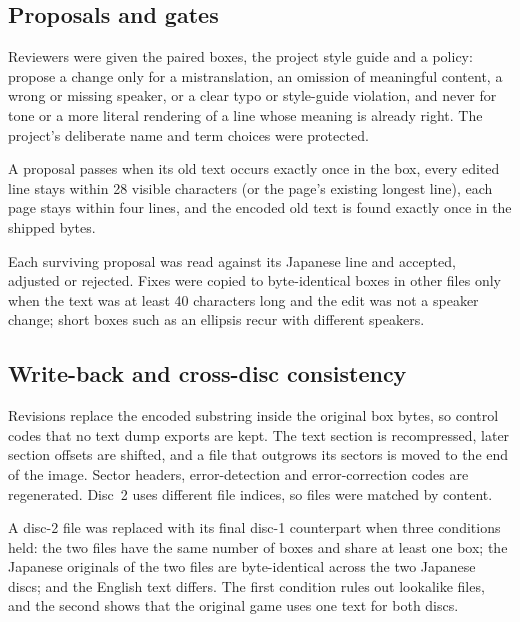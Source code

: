 \documentclass[11pt]{article}
\begin{document}
\subsection{Proposals and gates}

Reviewers were given the paired boxes, the project style guide
\citep{pwstyle} and a policy: propose a change only for a
mistranslation, an omission of meaningful content, a wrong or missing
speaker, or a clear typo or style-guide violation, and never for tone or
a more literal rendering of a line whose meaning is already right. The
project's deliberate name and term choices were protected.

 A proposal passes when its old text
occurs exactly once in the box, every edited line stays within
28 visible characters (or the page's existing longest line), each page
stays within four lines, and the encoded old text is found exactly once
in the shipped bytes.

 Each surviving proposal was read against
its Japanese line and accepted, adjusted or rejected. Fixes were copied
to byte-identical boxes in other files only when the text was at least
40 characters long and the edit was not a speaker change; short boxes
such as an ellipsis recur with different speakers.

\subsection{Write-back and cross-disc consistency}
\label{sec:sync}

Revisions replace the encoded substring inside the original box bytes,
so control codes that no text dump exports are kept. The text section is
recompressed, later section offsets are shifted, and a file that
outgrows its sectors is moved to the end of the image. Sector headers,
error-detection and error-correction codes are regenerated. Disc~2 uses
different file indices, so files were matched by content.

A disc-2 file was replaced with its final disc-1 counterpart when three
conditions held: the two files have the same number of boxes and share at
least one box; the Japanese originals of the two files are
byte-identical across the two Japanese discs; and the English text
differs. The first condition rules out lookalike files, and the second
shows that the original game uses one text for both discs.

\end{document}
